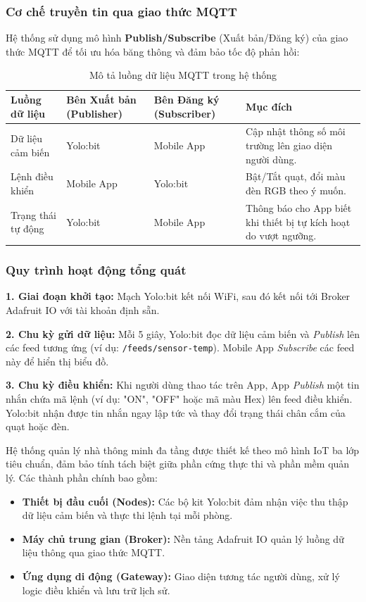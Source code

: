 \subsubsection{Cơ chế truyền tin qua giao thức MQTT}
Hệ thống sử dụng mô hình \textbf{Publish/Subscribe} (Xuất bản/Đăng ký) của giao thức MQTT để tối ưu hóa băng thông và đảm bảo tốc độ phản hồi:

\begin{table}[H]
\centering
\caption{Mô tả luồng dữ liệu MQTT trong hệ thống}
\begin{tabular}{|m{3cm}|m{3cm}|m{3cm}|m{4cm}|}
\hline
\textbf{Luồng dữ liệu} & \textbf{Bên Xuất bản (Publisher)} & \textbf{Bên Đăng ký (Subscriber)} & \textbf{Mục đích} \\ \hline
Dữ liệu cảm biến & Yolo:bit & Mobile App & Cập nhật thông số môi trường lên giao diện người dùng. \\ \hline
Lệnh điều khiển & Mobile App & Yolo:bit & Bật/Tắt quạt, đổi màu đèn RGB theo ý muốn. \\ \hline
Trạng thái tự động & Yolo:bit & Mobile App & Thông báo cho App biết khi thiết bị tự kích hoạt do vượt ngưỡng. \\ \hline
\end{tabular}
\end{table}

\subsubsection{Quy trình hoạt động tổng quát}

\textbf{1. Giai đoạn khởi tạo:} Mạch Yolo:bit kết nối WiFi, sau đó kết nối tới Broker Adafruit IO với tài khoản định sẵn.

\textbf{2. Chu kỳ gửi dữ liệu:} Mỗi 5 giây, Yolo:bit đọc dữ liệu cảm biến và \textit{Publish} lên các feed tương ứng (ví dụ: \texttt{/feeds/sensor-temp}). Mobile App \textit{Subscribe} các feed này để hiển thị biểu đồ.

\textbf{3. Chu kỳ điều khiển:} Khi người dùng thao tác trên App, App \textit{Publish} một tin nhắn chứa mã lệnh (ví dụ: "ON", "OFF" hoặc mã màu Hex) lên feed điều khiển. Yolo:bit nhận được tin nhắn ngay lập tức và thay đổi trạng thái chân cắm của quạt hoặc đèn.

Hệ thống quản lý nhà thông minh đa tầng được thiết kế theo mô hình IoT ba lớp tiêu chuẩn, đảm bảo tính tách biệt giữa phần cứng thực thi và phần mềm quản lý. Các thành phần chính bao gồm:
\begin{itemize}
    \item \textbf{Thiết bị đầu cuối (Nodes):} Các bộ kit Yolo:bit đảm nhận việc thu thập dữ liệu cảm biến và thực thi lệnh tại mỗi phòng.
    \item \textbf{Máy chủ trung gian (Broker):} Nền tảng Adafruit IO quản lý luồng dữ liệu thông qua giao thức MQTT.
    \item \textbf{Ứng dụng di động (Gateway):} Giao diện tương tác người dùng, xử lý logic điều khiển và lưu trữ lịch sử.
\end{itemize}

